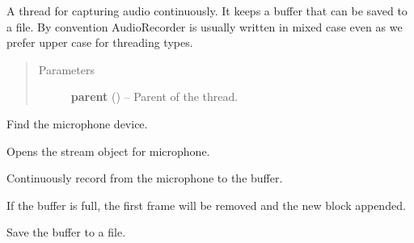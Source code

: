 \documentclass[letterpaper,10pt,english]{sphinxmanual}
\begin{document}
\begin{fulllineitems}
\label{threads:threads.audiorecorder.AudioRecorder}
A thread for capturing audio continuously.
It keeps a buffer that can be saved to a file.
By convention AudioRecorder is usually written in mixed case
even as we prefer upper case for threading types.
\begin{quote}\begin{description}
\item[{Parameters}] \leavevmode
\textbf{parent} () -- Parent of the thread.

\end{description}\end{quote}

\begin{fulllineitems}
\label{threads:threads.audiorecorder.AudioRecorder.find_input_device}
Find the microphone device.

\end{fulllineitems}


\begin{fulllineitems}
\label{threads:threads.audiorecorder.AudioRecorder.open_mic_stream}
Opens the stream object for microphone.

\end{fulllineitems}


\begin{fulllineitems}
\label{threads:threads.audiorecorder.AudioRecorder.run}
Continuously record from the microphone to the buffer.

If the buffer is full, the first frame will be removed and
the new block appended.

\end{fulllineitems}


\begin{fulllineitems}
\label{threads:threads.audiorecorder.AudioRecorder.save}
Save the buffer to a file.


\end{fulllineitems}
\end{fulllineitems}
\end{document}
